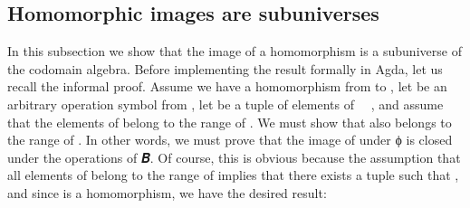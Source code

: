 \documentclass[a4paper,USenglish,cleveref,autoref,thm-restate]{lipics-v2019}
\begin{document}
\subsection{Homomorphic images are subuniverses}\label{sec:homomorphic-images-are-subuniverses}
In this subsection we show that the image of a homomorphism is a subuniverse of the codomain algebra. Before implementing the result formally in Agda, let us recall the informal proof.  Assume we have a homomorphism
\AgdaSpace{}%
\AgdaSymbol{:}\AgdaSpace{}%
\AgdaSpace{}%
\AgdaSpace{}%
 from  to ,
let  be an arbitrary operation symbol from , let
\AgdaSpace{}%
\AgdaSymbol{:}\AgdaSpace{}%
\AgdaSpace{}%
\AgdaSpace{}%
\AgdaSpace{}%
\AgdaSpace{}%
\AgdaSpace{}%
\AgdaSpace{}%
\AgdaSpace{}%
be a tuple of elements of ~~, and assume that the elements of  belong to the range of . We must show that \AgdaSymbol{(}\AgdaSpace{}\AgdaSpace{}\AgdaSymbol{)}\AgdaSpace{} also belongs to the range of . In other words, we must prove that the image of \univA under \AgdaBound ϕ is closed under the operations of \AgdaBound 𝑩. Of course, this is obvious because the assumption that all elements of  belong to the range of  implies that there exists a tuple
\AgdaSpace{}\AgdaSymbol{:}\AgdaSpace{}\AgdaSpace{}\AgdaSpace{}\AgdaSpace{}\AgdaSpace{}\AgdaSpace{}\AgdaSpace{}\AgdaSpace{}
such that
\AgdaSpace{}\AgdaSpace{}\AgdaSpace{}\AgdaSymbol{=}\AgdaSpace{}, and since  is a homomorphism, we have the desired result:
\begin{quote}
  \AgdaSymbol{(}\AgdaSpace{}\AgdaSpace{}\AgdaSymbol{)}\AgdaSpace{}\AgdaSpace{}\AgdaSymbol{=}\AgdaSpace{}\AgdaSymbol{(}\AgdaSpace{}\AgdaSpace{}\AgdaSymbol{)}\AgdaSymbol{(}\AgdaSpace{}\AgdaSpace{}\AgdaSymbol{)}\AgdaSpace{}\AgdaSymbol{=}\AgdaSpace{}\AgdaSpace{}\AgdaSymbol{(}\AgdaSymbol{(}\AgdaSpace{}\AgdaSpace{}\AgdaSymbol{)}\AgdaSpace{}\AgdaSymbol{)}
\end{quote}
\end{document}
